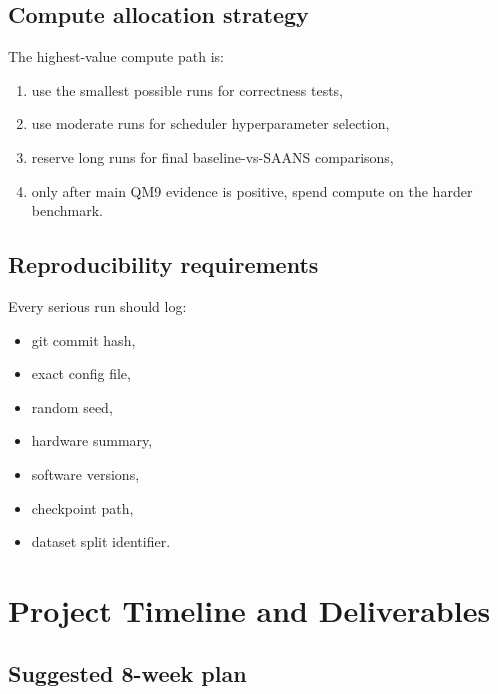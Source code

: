 \documentclass[11pt]{report}
\begin{document}
\section{Compute allocation strategy}

The highest-value compute path is:

\begin{enumerate}[leftmargin=2em]
    \item use the smallest possible runs for correctness tests,
    \item use moderate runs for scheduler hyperparameter selection,
    \item reserve long runs for final baseline-vs-SAANS comparisons,
    \item only after main QM9 evidence is positive, spend compute on the harder benchmark.
\end{enumerate}

\section{Reproducibility requirements}

Every serious run should log:

\begin{itemize}[leftmargin=2em]
    \item git commit hash,
    \item exact config file,
    \item random seed,
    \item hardware summary,
    \item software versions,
    \item checkpoint path,
    \item dataset split identifier.
\end{itemize}

\chapter{Project Timeline and Deliverables}

\section{Suggested 8-week plan}
\end{document}
